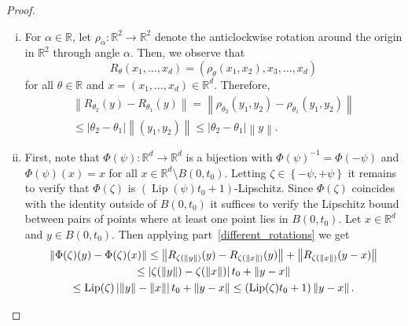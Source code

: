 \documentclass[a4paper, bibliography=totoc]{scrartcl}
\numberwithin{claimcounter}{define}
\newcommand{\R}{\mathbb{R}}
\newcommand{\lip}{\operatorname{Lip}}
\newcommand{\abs}[1]{\left|#1\right|}
\newcommand{\enorm}[1]{\left\|#1\right\|}
\newcommand{\set}[1]{\left\{#1\right\}}
\newcommand{\br}[1]{\left(#1\right)}
\begin{document}
\begin{proof}
	\begin{enumerate}[(i)]
		\item For $\alpha\in\R$, let $\rho_{\alpha}\colon \R^{2}\to\R^{2}$ denote the anticlockwise rotation around the origin in $\R^{2}$ through angle $\alpha$. Then, we observe that 
		\begin{equation*}
		R_{\theta}(x_{1},\ldots,x_{d})=(\rho_{\theta}(x_{1},x_{2}),x_{3},\ldots,x_{d})
		\end{equation*}
		for all $\theta\in \R$ and $x=(x_{1},\ldots,x_{d})\in\R^{d}$. Therefore,
		\begin{multline*}
		\enorm{R_{\theta_{2}}(y)-R_{\theta_{1}}(y)}=\enorm{\rho_{\theta_{2}}(y_{1},y_{2})-\rho_{\theta_{1}}(y_{1},y_{2})}\\
		\leq\abs{\theta_{2}-\theta_{1}}\enorm{(y_{1},y_{2})}\leq \abs{\theta_{2}-\theta_{1}}\enorm{y}.
		\end{multline*}
		\item First, note that $\Phi(\psi)\colon\R^{d}\to \R^{d}$ is a bijection with $\Phi(\psi)^{-1}=\Phi(-\psi)$ and $\Phi(\psi)(x)=x$ for all $x\in\R^{d}\setminus B(0,t_{0})$. Letting $\zeta\in\set{-\psi,+\psi}$ it remains to verify that $\Phi(\zeta)$ is $\br{\lip(\psi)t_{0}+1}$-Lipschitz. Since $\Phi(\zeta)$ coincides with the identity outside of $B(0,t_{0})$ it suffices to verify the Lipschitz bound between pairs of points where at least one point lies in $B(0,t_{0})$. Let $x\in\R^{d}$ and $y\in B(0,t_{0})$. Then applying part~\eqref{different_rotations} we get
		\begin{multline*}
		\enorm{\Phi(\zeta)(y)-\Phi(\zeta)(x)}\leq \enorm{R_{\zeta(\enorm{y})}(y)-R_{\zeta(\enorm{x})}(y)}+\enorm{R_{\zeta(\enorm{x})}(y-x)}\\
		\leq \abs{\zeta(\enorm{y})-\zeta(\enorm{x})}t_{0}+\enorm{y-x}\\
		\leq \lip(\zeta)\abs{\enorm{y}-\enorm{x}}t_{0}+\enorm{y-x}\leq \br{\lip(\zeta)t_{0}+1}\enorm{y-x}.\qedhere
		\end{multline*}
	\end{enumerate}	
\end{proof}
\end{document}
